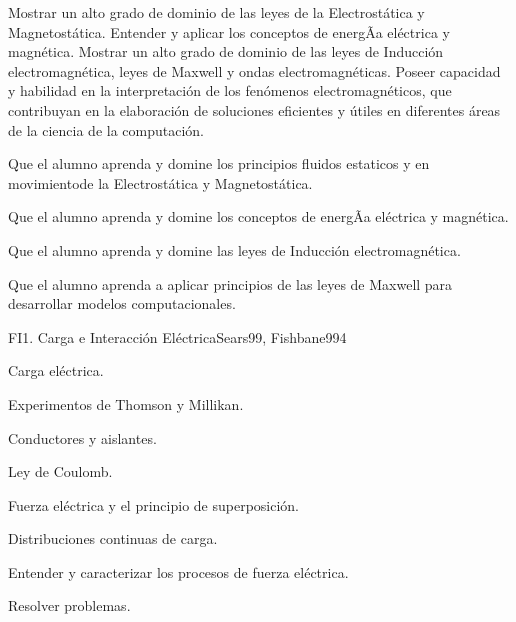 \begin{syllabus}


\begin{justification}
Mostrar un alto grado de dominio de las leyes de la Electrostática y Magnetostática. Entender y aplicar los conceptos de energÃ­a eléctrica y magnética. Mostrar un alto grado de dominio de las leyes de Inducción electromagnética, leyes de Maxwell y ondas electromagnéticas. Poseer capacidad y habilidad en la interpretación de los fenómenos electromagnéticos, que contribuyan en la elaboración de soluciones eficientes y útiles en diferentes áreas de la ciencia de la computación. 
\end{justification}

\begin{goals}
\item  Que el alumno aprenda y domine los principios fluidos estaticos y en movimientode la Electrostática y Magnetostática.
\item  Que el alumno aprenda y domine los conceptos de energÃ­a eléctrica y magnética.
\item  Que el alumno aprenda y domine las leyes de Inducción electromagnética.
\item  Que el alumno aprenda a aplicar principios de las leyes de Maxwell para desarrollar modelos computacionales.
\end{goals}

\begin{outcomes}
\end{outcomes}

\begin{unit}{FI1. Carga e Interacción Eléctrica}{Sears99, Fishbane99}{4}
   \begin{topics}
         \item  Carga eléctrica.
	 \item  Experimentos de Thomson y Millikan.
         \item  Conductores y aislantes.
	 \item  Ley de Coulomb.
         \item  Fuerza eléctrica y el principio de superposición.
         \item  Distribuciones continuas de carga.
   \end{topics}

   \begin{unitgoals}
         \item  Entender y caracterizar los procesos de fuerza eléctrica.
         \item  Resolver problemas.
   \end{unitgoals}
\end{unit}


\end{syllabus}
